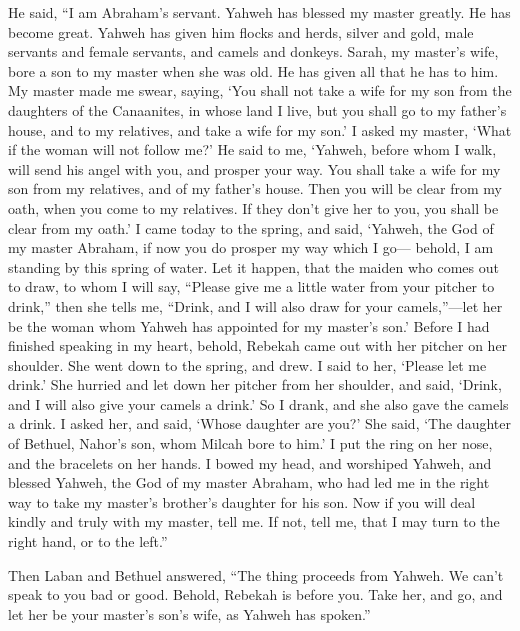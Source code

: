  He said, ``I am Abraham's servant. 
Yahweh has blessed my master greatly. He has become great. Yahweh has
given him flocks and herds, silver and gold, male servants and female
servants, and camels and donkeys.  Sarah, my master's
wife, bore a son to my master when she was old. He has given all that he
has to him.  My master made me swear, saying, `You shall
not take a wife for my son from the daughters of the Canaanites, in
whose land I live,  but you shall go to my father's
house, and to my relatives, and take a wife for my son.' 
I asked my master, `What if the woman will not follow me?'
 He said to me, `Yahweh, before whom I walk, will send
his angel with you, and prosper your way. You shall take a wife for my
son from my relatives, and of my father's house.  Then
you will be clear from my oath, when you come to my relatives. If they
don't give her to you, you shall be clear from my oath.' 
I came today to the spring, and said, `Yahweh, the God of my master
Abraham, if now you do prosper my way which I go--- 
behold, I am standing by this spring of water. Let it happen, that the
maiden who comes out to draw, to whom I will say, ``Please give me a
little water from your pitcher to drink,''  then she
tells me, ``Drink, and I will also draw for your camels,''---let her be
the woman whom Yahweh has appointed for my master's son.'
 Before I had finished speaking in my heart, behold,
Rebekah came out with her pitcher on her shoulder. She went down to the
spring, and drew. I said to her, `Please let me drink.' 
She hurried and let down her pitcher from her shoulder, and said,
`Drink, and I will also give your camels a drink.' So I drank, and she
also gave the camels a drink.  I asked her, and said,
`Whose daughter are you?' She said, `The daughter of Bethuel, Nahor's
son, whom Milcah bore to him.' I put the ring on her nose, and the
bracelets on her hands.  I bowed my head, and worshiped
Yahweh, and blessed Yahweh, the God of my master Abraham, who had led me
in the right way to take my master's brother's daughter for his son.
 Now if you will deal kindly and truly with my master,
tell me. If not, tell me, that I may turn to the right hand, or to the
left.''

 Then Laban and Bethuel answered, ``The thing proceeds
from Yahweh. We can't speak to you bad or good.  Behold,
Rebekah is before you. Take her, and go, and let her be your master's
son's wife, as Yahweh has spoken.''

